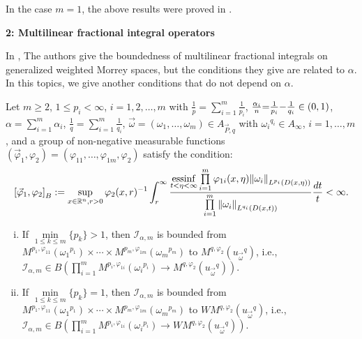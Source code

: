 \documentclass[11pt, twoside, leqno]{article}
\begin{document}
\begin{rem}
	In the case $m=1$, the above results were proved in \cite{Gu7}.
\end{rem}

\begin{center}
	\textbf{2: Multilinear fractional integral operators}
\end{center}

In \cite{Hu-Wang}, The authors give the boundedness of multilinear fractional integrals on generalized weighted Morrey spaces, but the conditions they give are related to $\alpha$. In this topics, we give another conditions that do not depend on $\alpha$.
\begin{thm}\label{thm7}
	Let $m\geq 2$, $1\leq p_i<\infty$, $i=1,2,\ldots,m$ with $\frac{1}{p} = \sum\limits_{i = 1}^m {\frac{1}{{{p_i}}}}$, $\frac{{{\alpha _i}}}{n}{\rm{ = }}\frac{1}{{{p_i}}}{\rm{ - }}\frac{1}{{{q_i}}} \in (0,1)$, $\alpha  = \sum\limits_{i = 1}^m {{\alpha _i}}$, $\frac{1}{q} = \sum\limits_{i = 1}^m {\frac{1}{{{q_i}}}}$, $\vec{\omega}=(\omega_1,\ldots,\omega_m) \in {A_{\vec P,q}}$ with ${\omega _i}^{{q_i}} \in {A_\infty }$, $i = 1, \ldots ,m$, and a group of non-negative measurable functions $({{\vec \varphi }_1},{\varphi _2}) = ({\varphi _{11}}, \ldots ,{\varphi _{1m}},{\varphi _2})$ satisfy the condition:
	\begin{equation}\label{con3}
	{\left[ {{{\vec \varphi }_1},{\varphi _2}} \right]_B}: = \mathop {\sup }\limits_{x \in {{\mathbb R^n}},r > 0} {\varphi _2}{(x,r)^{{\rm{ - }}1}}\int_r^\infty  {\frac{{\mathop {{\rm{essinf}}}\limits_{t < \eta  < \infty } \prod\limits_{i = 1}^m {{\varphi _{1i}}(x,\eta ){{\left\| {{\omega _i}} \right\|}_{{L^{{p_i}}}(D(x,\eta ))}}} }}{{\prod\limits_{i = 1}^m {{{\left\| {{\omega _i}} \right\|}_{{L^{{q_i}}}(D(x,t))}}} }}\frac{{dt}}{t}}  < \infty.
	\end{equation}
	
	\begin{enumerate}[(i)]
		\item If $\mathop {\min }\limits_{1 \le k \le m} \{ {p_k}\}  > 1$, then ${\mathcal I}_{\alpha,m}$ is bounded from ${M^{{p_1},{\varphi _{11}}}}({\omega _1}^{p_1}) \times  \cdots  \times {M^{{p_m},{\varphi _{1m}}}}({\omega _m}^{p_m})$ to ${M^{q,{\varphi _2}}}({u_{\vec \omega }}^q)$, i.e., ${\mathcal I}_{\alpha,m} \in B\left( {\prod\limits_{i = 1}^m {{M^{{p_i},{\varphi _{1i}}}}\left( {{\omega _i}^{p_i}} \right)}  \to {M^{q,{\varphi _2}}}\left( {{u_{\vec \omega }}^q} \right)} \right)$.
		\item If $\mathop {\min }\limits_{1 \le k \le m} \{ {p_k}\}  = 1$, then ${\mathcal I}_{\alpha,m}$ is bounded from ${M^{{p_1},{\varphi _{11}}}}({\omega _1}^{p_1}) \times  \cdots  \times {M^{{p_m},{\varphi _{1m}}}}({\omega _m}^{p_m})$ to ${WM^{q,{\varphi _2}}}({u_{\vec \omega }}^q)$, i.e., ${\mathcal I}_{\alpha,m}\in B\left( {\prod\limits_{i = 1}^m {{M^{{p_i},{\varphi _{1i}}}}\left( {{\omega _i}^{p_i}} \right)}  \to {WM^{q,{\varphi _2}}}\left( {{u_{\vec \omega }}^q} \right)} \right)$.
	\end{enumerate}
\end{thm}
\end{document}
